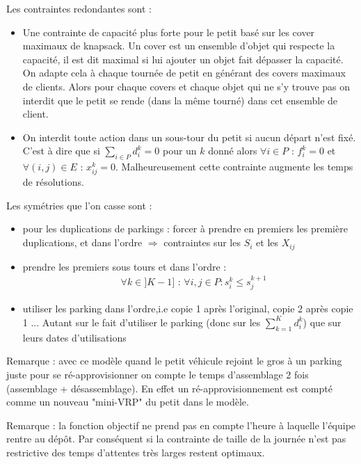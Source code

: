 \documentclass[12pt,a4paper,fleqn]{article}
\begin{document}
Les contraintes redondantes sont :
\begin{itemize}
\item Une contrainte de capacité plus forte pour le petit basé sur les cover maximaux de knapsack. Un cover est un ensemble d'objet qui respecte la capacité, il est dit maximal si lui ajouter un objet fait dépasser la capacité. On adapte cela à chaque tournée de petit en générant des covers maximaux de clients. Alors pour chaque covers et chaque objet qui ne s'y trouve pas on interdit que le petit se rende (dans la même tourné) dans cet ensemble de client.
\item On interdit toute action dans un sous-tour du petit si aucun départ n'est fixé. C'est à dire que si $\sum \limits_{i \in P}d_i^k = 0$ pour un $k$ donné alors $\forall i \in P \text{ : } f_i^k = 0$ et $\forall (i,j) \in E \text{ : } x^k_{ij} = 0$. Malheureusement cette contrainte augmente les temps de résolutions.
\end{itemize}

Les symétries que l'on casse sont :
\begin{itemize}
\item pour les duplications de parkings : forcer à prendre en premiers les première duplications, et dans l'ordre $\Rightarrow$ contraintes sur les $S_i$ et les $X_{ij}$
\item prendre les premiers sous tours et dans l'ordre :
\begin{align}
& \forall k \in ]K-1] \text{ : } \forall i,j \in P : s^k_i \leqslant s^{k+1}_j \label{symetriesoustours2}
\end{align}
\item utiliser les parking dans l'ordre,i.e copie 1 après l'original, copie 2 après copie 1 ... Autant sur le fait d'utiliser le parking (donc sur les $\sum \limits_{k = 1}^K d_i^k$) que sur leurs dates d'utilisations
\end{itemize}

\bigskip

Remarque : avec ce modèle quand le petit véhicule rejoint le gros à un parking juste pour se ré-approvisionner on compte le temps d'assemblage 2 fois (assemblage + désassemblage). En effet un ré-approvisionnement est compté comme un nouveau "mini-VRP" du petit dans le modèle.

\bigskip

Remarque : la fonction objectif ne prend pas en compte l'heure à laquelle l'équipe rentre au dépôt. Par conséquent si la contrainte de taille de la journée n'est pas restrictive des temps d’attentes très larges restent optimaux.
\end{document}
